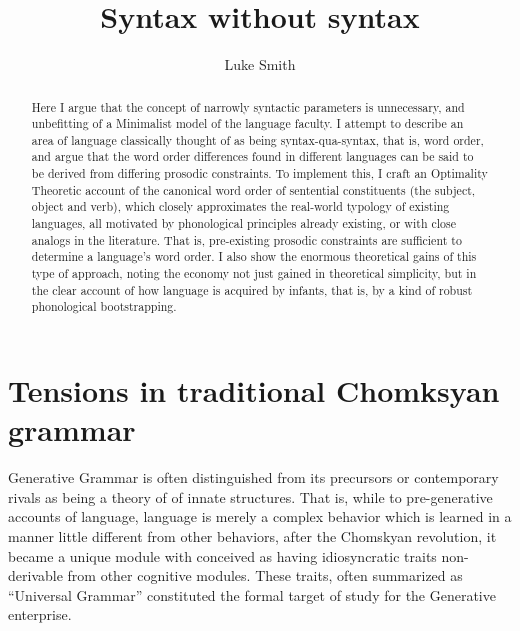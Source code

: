 \documentclass{article}
\title{Syntax without syntax}
\author{Luke Smith}
\begin{document}
\maketitle

\begin{abstract}
Here I argue that the concept of narrowly syntactic parameters is unnecessary, and unbefitting of a Minimalist model of the language faculty.
I attempt to describe an area of language classically thought of as being syntax-qua-syntax, that is, word order, and argue that the word order differences found in different languages can be said to be derived from differing prosodic constraints.
To implement this, I craft an Optimality Theoretic account of the canonical word order of sentential constituents (the subject, object and verb), which closely approximates the real-world typology of existing languages, all motivated by phonological principles already existing, or with close analogs in the literature.
That is, pre-existing prosodic constraints are sufficient to determine a language's word order.
I also show the enormous theoretical gains of this type of approach, noting the economy not just gained in theoretical simplicity, but in the clear account of how language is acquired by infants, that is, by a kind of robust phonological bootstrapping.
\end{abstract}

\tableofcontents

\listoffigures
\doublespacing

\section{Tensions in traditional Chomksyan grammar}

Generative Grammar is often distinguished from its precursors or contemporary rivals as being a theory of of innate structures.
That is, while to pre-generative accounts of language, language is merely a complex behavior which is learned in a manner little different from other behaviors, after the Chomskyan revolution, it became a unique module with conceived as having idiosyncratic traits non-derivable from other cognitive modules.
These traits, often summarized as ``Universal Grammar'' constituted the formal target of study for the Generative enterprise.
\end{document}
